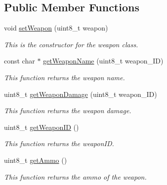 \subsection*{Public Member Functions}
\begin{DoxyCompactItemize}
\item 
void \mbox{\hyperlink{class_weapon_a6d42418876685100d754e566c627aea7}{set\+Weapon}} (uint8\+\_\+t weapon)
\begin{DoxyCompactList}\small\item\em This is the constructor for the weapon class. \end{DoxyCompactList}\item 
\mbox{\label{class_weapon_a1744536f5f55f6cf87d3e09d23b467c3}} 
const char $\ast$ \mbox{\hyperlink{class_weapon_a1744536f5f55f6cf87d3e09d23b467c3}{get\+Weapon\+Name}} (uint8\+\_\+t weapon\+\_\+\+ID)
\begin{DoxyCompactList}\small\item\em This function returns the weapon name. \end{DoxyCompactList}\item 
\mbox{\label{class_weapon_a2c20f2b180ea9445ced8fe76e181db63}} 
uint8\+\_\+t \mbox{\hyperlink{class_weapon_a2c20f2b180ea9445ced8fe76e181db63}{get\+Weapon\+Damage}} (uint8\+\_\+t weapon\+\_\+\+ID)
\begin{DoxyCompactList}\small\item\em This function returns the weapon damage. \end{DoxyCompactList}\item 
\mbox{\label{class_weapon_ae290125f66f5c24272b6e708d078ef78}} 
uint8\+\_\+t \mbox{\hyperlink{class_weapon_ae290125f66f5c24272b6e708d078ef78}{get\+Weapon\+ID}} ()
\begin{DoxyCompactList}\small\item\em This function returns the weapon\+ID. \end{DoxyCompactList}\item 
\mbox{\label{class_weapon_a40bcd96fc932869e50fd2e7287ec8d9c}} 
uint8\+\_\+t \mbox{\hyperlink{class_weapon_a40bcd96fc932869e50fd2e7287ec8d9c}{get\+Ammo}} ()
\begin{DoxyCompactList}\small\item\em This function returns the ammo of the weapon. \end{DoxyCompactList}\item 

\end{DoxyCompactItemize}
